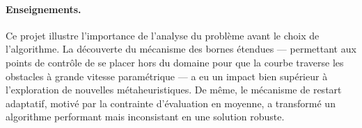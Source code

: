 \paragraph{Enseignements.}
Ce projet illustre l'importance de l'analyse du problème avant le choix de
l'algorithme.  La découverte du mécanisme des bornes étendues — permettant aux
points de contrôle de se placer hors du domaine pour que la courbe traverse les
obstacles à grande vitesse paramétrique — a eu un impact bien supérieur à
l'exploration de nouvelles métaheuristiques.  De même, le mécanisme de restart
adaptatif, motivé par la contrainte d'évaluation en moyenne, a transformé un
algorithme performant mais inconsistant en une solution robuste.
